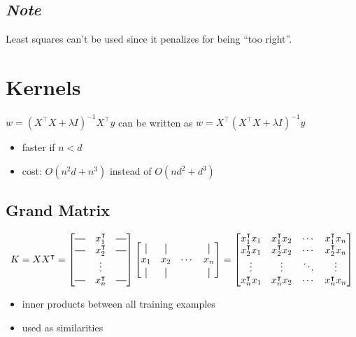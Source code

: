 \documentclass[10pt,landscape,a4paper]{article}
\newcommand*{\vertbar}{\rule[-1ex]{0.5pt}{2.5ex}}
\newcommand*{\horzbar}{\rule[.5ex]{2.5ex}{0.5pt}}
\begin{document}
\begin{multicols*}{5}
\subsection{\emph{Note}}
Least squares can't be used since it penalizes for being ``too right''.

\section{Kernels}
\(w = (X^\intercal X + \lambda I)^{-1} X^\intercal y\) can be written as \(w = X^\intercal (X^\intercal X + \lambda I)^{-1} y\)
\begin{itemize}
    \item faster if \(n < d\)
    \item cost: \(O(n^2d + n^3)\) instead of \(O(nd^2 + d^3)\)
\end{itemize}

\subsection{Grand Matrix}
\begin{dmath*}
    K = XX^\intercal=
    \begin{bmatrix}
       \horzbar &  x_1^\intercal & \horzbar \\
       \horzbar &  x_2^\intercal & \horzbar \\
        & \vdots & \\
        \horzbar &  x_n^\intercal & \horzbar \\
    \end{bmatrix}
    \begin{bmatrix}
        \vertbar &  \vertbar & & \vertbar \\
        x_1 & x_2 & \cdots &  x_n \\
        \vertbar & \vertbar & & \vertbar \\
    \end{bmatrix}
    =
    \begin{bmatrix}
        x_1^\intercal x_1 & x_1^\intercal x_2 & \cdots & x_1^\intercal x_n \\
        x_2^\intercal x_1 & x_2^\intercal x_2 & \cdots & x_2^\intercal x_n \\
        \vdots & \vdots & \ddots & \vdots \\
        x_n^\intercal x_1 & x_n^\intercal x_2 & \cdots & x_n^\intercal x_n\\
    \end{bmatrix}
\end{dmath*}
\begin{itemize}
    \item inner products between all training examples
    \item used as similarities
\end{itemize}


\end{multicols*}
\end{document}
